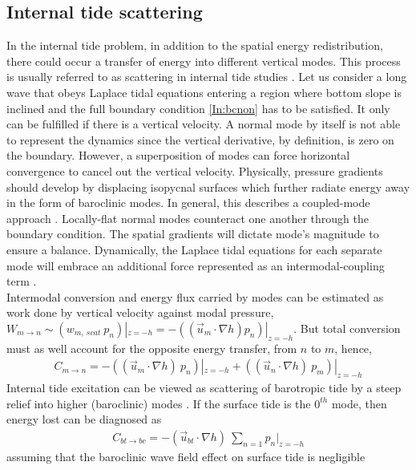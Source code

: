 \documentclass[12pt]{article}
\begin{document}
\subsection{Internal tide scattering}
In the internal tide problem, in addition to the spatial energy redistribution, there could occur a 
transfer of energy into different vertical modes. This process is usually referred to as scattering 
in internal tide studies \citep[e.g.][]{muller1992scattering}. Let us consider a long wave that 
obeys Laplace tidal equations entering a region where bottom slope is inclined and the full 
boundary condition \eqref{In:bcnon} has to be satisfied. It only can be fulfilled if there is a 
vertical velocity. A normal mode by itself is not able to represent the dynamics since the vertical 
derivative, by definition, is zero on the boundary. However, a superposition of modes can force 
horizontal convergence to cancel out the vertical velocity. Physically, pressure gradients should 
develop by displacing isopycnal surfaces which further radiate energy away in the form of 
baroclinic modes. In general, this describes a coupled-mode approach \citep{griffiths2007internal}. 
Locally-flat normal modes counteract one another through the boundary condition. The spatial 
gradients will dictate mode's magnitude to ensure a balance. Dynamically, the Laplace tidal 
equations for each separate mode will embrace an additional force represented as an 
intermodal-coupling term \citep{griffiths2007internal, kelly2016coupled}.\\
Intermodal conversion and energy flux carried by modes can be estimated as work done by 
vertical velocity against modal pressure, $W_{m \to n} \sim (w_{m,~scat}~p_n)|_{z = 
-h} = -((\vec{u}_m \cdot \nabla h) p_n)|_{z = -h}$. But total conversion must as well account for 
the opposite energy transfer, from $n$ to $m$, hence,
\begin{align}
\label{In:en.trans}
C_{m \to n} = -((\vec{u}_m \cdot \nabla h)~p_n)|_{z = -h} + ((\vec{u}_n \cdot \nabla h)~p_m)|_{z = 
-h}
\end{align}
Internal tide excitation can be viewed as scattering of barotropic tide by a steep relief into 
higher (baroclinic) modes \citep{hendershott1981long}. If the surface tide is the $0^{th}$ mode, 
then energy lost can be diagnosed as
\begin{align}
\label{In:bt_bc}
C_{bt \to bc} = -(\vec{u}_{bt} \cdot \nabla h)~\sum_{n = 1} p_n|_{z = -h}
\end{align}
assuming that the baroclinic wave field effect on surface tide is negligible 
\end{document}
